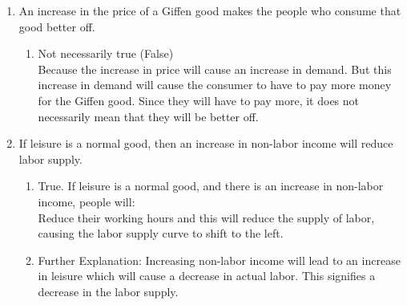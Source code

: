 \documentclass[11pt]{article}
\begin{document}
\begin{enumerate}
\begin{enumerate}
    \item An increase in the price of a Giffen good makes the people who consume that good better off.
    \begin{enumerate}
        \item Not necessarily true (False)\\
        Because the increase in price will cause an increase in demand. But this increase in demand will cause the consumer to have to pay more money for the Giffen good. Since they will have to pay more, it does not necessarily mean that they will be better off.
    \end{enumerate}

    \item If leisure is a normal good, then an increase in non-labor income will reduce labor supply.
    \begin{enumerate}
        \item True. If leisure is a normal good, and there is an increase in non-labor income, people will:\\ Reduce their working hours and this will reduce the supply of labor, causing the labor supply curve to shift to the left.
        \item Further Explanation: Increasing non-labor income will lead to an increase in leisure which will cause a decrease in actual labor. This signifies a decrease in the labor supply.
    \end{enumerate}

\end{enumerate}


\end{enumerate}
\end{document}
